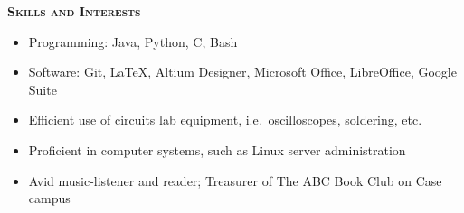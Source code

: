 \documentclass[12pt]{article}
\newcommand*{\titlefont}{\fontfamily{pnc}\selectfont}
\begin{document}
\bigbreak{}

{\titlefont\large\textsc{\textbf{Skills and Interests}}}
\hrulefill{}\\
%
\vspace{-\topsep}
\begin{itemize}
    \setlength{\parskip}{0pt}
    \setlength{\itemsep}{0pt plus 1 pt}
    \item Programming: Java, Python, C, Bash
    \item Software: Git, LaTeX, Altium Designer, Microsoft Office, LibreOffice, Google Suite
    \item Efficient use of circuits lab equipment, i.e.\ oscilloscopes, soldering, etc.
    \item Proficient in computer systems, such as Linux server administration
    \item Avid music-listener and reader; Treasurer of The ABC Book Club on Case campus

\end{itemize}
\end{document}
